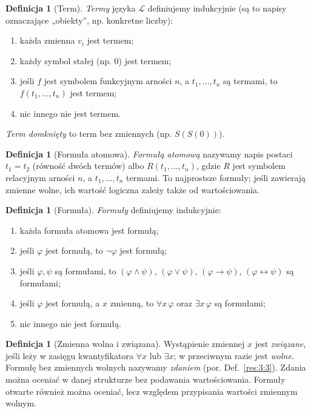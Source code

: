 \documentclass[11pt,a4paper]{article}
\numberwithin{equation}{section}
\theoremstyle{plain}
\theoremstyle{definition}
\newtheorem{definicja}[twierdzenie]{Definicja}
\theoremstyle{remark}
\begin{document}
\begin{definicja}[Term]\label{res:2:8}
\emph{Termy} języka $\mathcal L$ definiujemy indukcyjnie (są to napisy oznaczające „obiekty”, np. konkretne liczby):
\begin{enumerate}[label=(\roman*)]
\item każda zmienna $v_i$ jest termem;
\item każdy symbol stałej (np. $0$) jest termem;
\item jeśli $f$ jest symbolem funkcyjnym arności $n$, a $t_1,\ldots,t_n$ są termami, to $f(t_1,\ldots,t_n)$ jest termem;
\item nic innego nie jest termem.
\end{enumerate}
\emph{Term domknięty} to term bez zmiennych (np. $S(S(0))$).
\end{definicja}

\begin{definicja}[Formuła atomowa]\label{res:2:9}
\emph{Formułą atomową} nazywamy napis postaci $t_1=t_2$ (równość dwóch termów) albo $R(t_1,\ldots,t_n)$, gdzie $R$ jest symbolem relacyjnym arności $n$, a $t_1,\ldots,t_n$ termami. To najprostsze formuły; jeśli zawierają zmienne wolne, ich wartość logiczna zależy także od wartościowania.
\end{definicja}

\begin{definicja}[Formuła]\label{res:2:10}
\emph{Formuły} definiujemy indukcyjnie:
\begin{enumerate}[label=(\roman*)]
\item każda formuła atomowa jest formułą;
\item jeśli $\varphi$ jest formułą, to $\neg\varphi$ jest formułą;
\item jeśli $\varphi,\psi$ są formułami, to $(\varphi\land\psi)$, $(\varphi\lor\psi)$, $(\varphi\to\psi)$, $(\varphi\leftrightarrow\psi)$ są formułami;
\item jeśli $\varphi$ jest formułą, a $x$ zmienną, to $\forall x\,\varphi$ oraz $\exists x\,\varphi$ są formułami;
\item nic innego nie jest formułą.
\end{enumerate}
\end{definicja}

\begin{definicja}[Zmienna wolna i związana]\label{res:2:11}
Wystąpienie zmiennej $x$ jest \emph{związane}, jeśli leży w zasięgu kwantyfikatora $\forall x$ lub $\exists x$; w przeciwnym razie jest \emph{wolne}. Formułę bez zmiennych wolnych nazywamy \emph{zdaniem} (por. Def.~\ref{res:3:3}). Zdania można oceniać w danej strukturze bez podawania wartościowania. Formuły otwarte również można oceniać, lecz względem przypisania wartości zmiennym wolnym.
\end{definicja}
\end{document}
